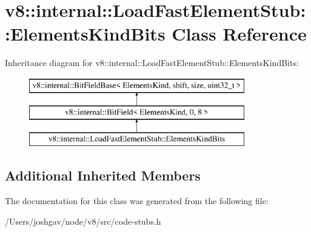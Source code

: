 \hypertarget{classv8_1_1internal_1_1_load_fast_element_stub_1_1_elements_kind_bits}{}\section{v8\+:\+:internal\+:\+:Load\+Fast\+Element\+Stub\+:\+:Elements\+Kind\+Bits Class Reference}
\label{classv8_1_1internal_1_1_load_fast_element_stub_1_1_elements_kind_bits}
Inheritance diagram for v8\+:\+:internal\+:\+:Load\+Fast\+Element\+Stub\+:\+:Elements\+Kind\+Bits\+:\begin{figure}[H]
\begin{center}
\leavevmode
\includegraphics[height=3.000000cm]{classv8_1_1internal_1_1_load_fast_element_stub_1_1_elements_kind_bits}
\end{center}
\end{figure}
\subsection*{Additional Inherited Members}


The documentation for this class was generated from the following file\+:\begin{DoxyCompactItemize}
\item 
/\+Users/joshgav/node/v8/src/code-\/stubs.\+h\end{DoxyCompactItemize}
